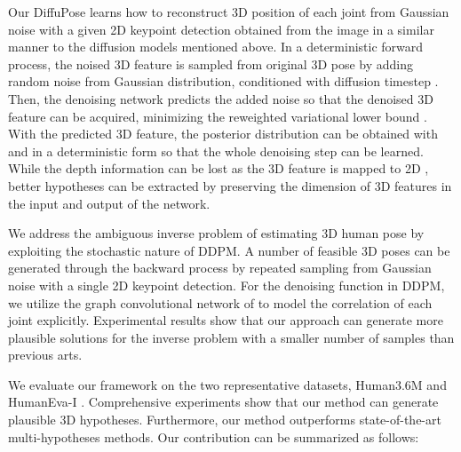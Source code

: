 \documentclass[letterpaper, 10 pt, conference]{ieeeconf}
\begin{document}
Our DiffuPose learns how to reconstruct 3D position of each joint from Gaussian noise with a given 2D keypoint detection obtained from the image in a similar manner to the diffusion models mentioned above.
In a deterministic forward process, the noised 3D feature  is sampled from original 3D pose  by adding random noise  from Gaussian distribution, conditioned with diffusion timestep .
Then, the denoising network predicts the added noise  so that the denoised 3D feature can be acquired, minimizing the reweighted variational lower bound \cite{ho2020denoising}.
With the predicted 3D feature, the posterior distribution  can be obtained with  and  in a deterministic form so that the whole denoising step can be learned.
While the depth information can be lost as the 3D feature is mapped to 2D \cite{wehrbein2021probabilistic}, better hypotheses can be extracted by preserving the dimension of 3D features in the input and output of the network.

We address the ambiguous inverse problem of estimating 3D human pose by exploiting the stochastic nature of DDPM.
A number of feasible 3D poses can be generated through the backward process by repeated sampling from Gaussian noise with a single 2D keypoint detection.
For the denoising function in DDPM, we utilize the graph convolutional network of \cite{zou2021modulated} to model the correlation of each joint explicitly.
Experimental results show that our approach can generate more plausible solutions for the inverse problem with a smaller number of samples than previous arts.

We evaluate our framework on the two representative datasets, Human3.6M \cite{ionescu2013human3} and HumanEva-I \cite{sigal2010humaneva}.
Comprehensive experiments show that our method can generate plausible 3D hypotheses.
Furthermore, our method outperforms state-of-the-art multi-hypotheses methods.
Our contribution can be summarized as follows:
\end{document}
